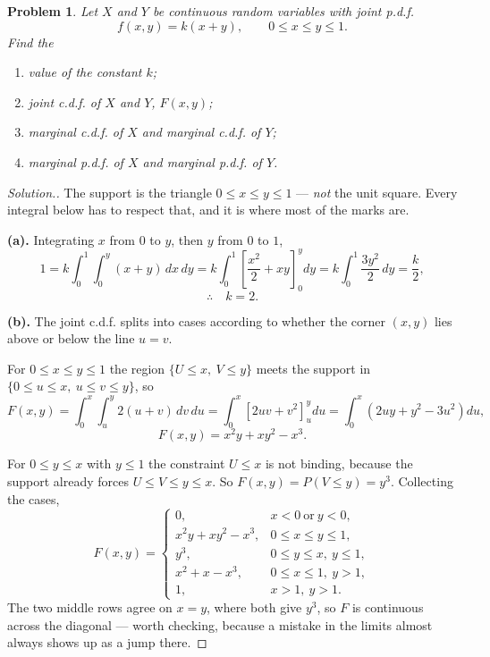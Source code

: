 \documentclass[12pt,a4paper]{report}
\theoremstyle{definition}
\theoremstyle{plain}
\newtheorem{problemx}{Problem}[section]
\newenvironment{problem}{\begin{problemx}}{\end{problemx}}
\newenvironment{solution}
  {\renewcommand{\qedsymbol}{}\begin{proof}[\textit{Solution}.]}
  {\end{proof}}
\begin{document}
\begin{problem}
Let $X$ and $Y$ be continuous random variables with joint p.d.f.
\[f(x,y)=k(x+y),\qquad 0\leq x\leq y\leq1.\]
Find the
\begin{enumerate}
\item[(a).] value of the constant $k$;
\item[(b).] joint c.d.f. of $X$ and $Y$, $F(x,y)$;
\item[(c).] marginal c.d.f. of $X$ and marginal c.d.f. of $Y$;
\item[(d).] marginal p.d.f. of $X$ and marginal p.d.f. of $Y$.
\end{enumerate}
\end{problem}

\begin{solution}
The support is the triangle $0\leq x\leq y\leq1$ --- \emph{not} the unit square.
Every integral below has to respect that, and it is where most of the marks are.

\textbf{(a).} Integrating $x$ from $0$ to $y$, then $y$ from $0$ to $1$,
\[1=k\int_0^1\!\!\int_0^y(x+y)\,dx\,dy
=k\int_0^1\left[\frac{x^2}{2}+xy\right]_0^y dy
=k\int_0^1\frac{3y^2}{2}\,dy
=\frac{k}{2},\]
\[\therefore\quad k=2.\]

\textbf{(b).} The joint c.d.f. splits into cases according to whether the corner
$(x,y)$ lies above or below the line $u=v$.

For $0\leq x\leq y\leq1$ the region $\{U\leq x,\ V\leq y\}$ meets the support in
$\{0\leq u\leq x,\ u\leq v\leq y\}$, so
\[F(x,y)=\int_0^x\!\!\int_u^y2(u+v)\,dv\,du
=\int_0^x\left[2uv+v^2\right]_u^y du
=\int_0^x\left(2uy+y^2-3u^2\right)du,\]
\[F(x,y)=x^2y+xy^2-x^3.\]

For $0\leq y\leq x$ with $y\leq1$ the constraint $U\leq x$ is not binding, because
the support already forces $U\leq V\leq y\leq x$. So $F(x,y)=P(V\leq y)=y^3$.
Collecting the cases,
\[F(x,y)=\begin{cases}
0, & x<0\ \text{or}\ y<0,\\[2pt]
x^2y+xy^2-x^3, & 0\leq x\leq y\leq1,\\[2pt]
y^3, & 0\leq y\leq x,\ y\leq1,\\[2pt]
x^2+x-x^3, & 0\leq x\leq1,\ y>1,\\[2pt]
1, & x>1,\ y>1.
\end{cases}\]
The two middle rows agree on $x=y$, where both give $y^3$, so $F$ is continuous
across the diagonal --- worth checking, because a mistake in the limits almost
always shows up as a jump there.


\end{solution}
\end{document}
